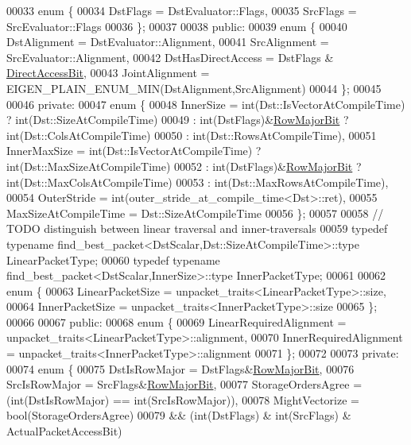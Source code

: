 \begin{DoxyCode}
00033   \textcolor{keyword}{enum} \{
00034     DstFlags = DstEvaluator::Flags,
00035     SrcFlags = SrcEvaluator::Flags
00036   \};
00037   
00038 \textcolor{keyword}{public}:
00039   \textcolor{keyword}{enum} \{
00040     DstAlignment = DstEvaluator::Alignment,
00041     SrcAlignment = SrcEvaluator::Alignment,
00042     DstHasDirectAccess = DstFlags & \hyperlink{group__flags_gabf1e9d0516a933445a4c307ad8f14915}{DirectAccessBit},
00043     JointAlignment = EIGEN\_PLAIN\_ENUM\_MIN(DstAlignment,SrcAlignment)
00044   \};
00045 
00046 \textcolor{keyword}{private}:
00047   \textcolor{keyword}{enum} \{
00048     InnerSize = int(Dst::IsVectorAtCompileTime) ? int(Dst::SizeAtCompileTime)
00049               : int(DstFlags)&\hyperlink{group__flags_gae4f56c2a60bbe4bd2e44c5b19cbe8762}{RowMajorBit} ? int(Dst::ColsAtCompileTime)
00050               : int(Dst::RowsAtCompileTime),
00051     InnerMaxSize = int(Dst::IsVectorAtCompileTime) ? int(Dst::MaxSizeAtCompileTime)
00052               : int(DstFlags)&\hyperlink{group__flags_gae4f56c2a60bbe4bd2e44c5b19cbe8762}{RowMajorBit} ? int(Dst::MaxColsAtCompileTime)
00053               : int(Dst::MaxRowsAtCompileTime),
00054     OuterStride = int(outer\_stride\_at\_compile\_time<Dst>::ret),
00055     MaxSizeAtCompileTime = Dst::SizeAtCompileTime
00056   \};
00057 
00058   \textcolor{comment}{// TODO distinguish between linear traversal and inner-traversals}
00059   \textcolor{keyword}{typedef} \textcolor{keyword}{typename} find\_best\_packet<DstScalar,Dst::SizeAtCompileTime>::type LinearPacketType;
00060   \textcolor{keyword}{typedef} \textcolor{keyword}{typename} find\_best\_packet<DstScalar,InnerSize>::type InnerPacketType;
00061 
00062   \textcolor{keyword}{enum} \{
00063     LinearPacketSize = unpacket\_traits<LinearPacketType>::size,
00064     InnerPacketSize = unpacket\_traits<InnerPacketType>::size
00065   \};
00066 
00067 \textcolor{keyword}{public}:
00068   \textcolor{keyword}{enum} \{
00069     LinearRequiredAlignment = unpacket\_traits<LinearPacketType>::alignment,
00070     InnerRequiredAlignment = unpacket\_traits<InnerPacketType>::alignment
00071   \};
00072 
00073 \textcolor{keyword}{private}:
00074   \textcolor{keyword}{enum} \{
00075     DstIsRowMajor = DstFlags&\hyperlink{group__flags_gae4f56c2a60bbe4bd2e44c5b19cbe8762}{RowMajorBit},
00076     SrcIsRowMajor = SrcFlags&\hyperlink{group__flags_gae4f56c2a60bbe4bd2e44c5b19cbe8762}{RowMajorBit},
00077     StorageOrdersAgree = (int(DstIsRowMajor) == int(SrcIsRowMajor)),
00078     MightVectorize = \textcolor{keywordtype}{bool}(StorageOrdersAgree)
00079                   && (int(DstFlags) & int(SrcFlags) & ActualPacketAccessBit)

\end{DoxyCode}
